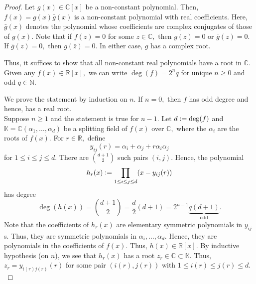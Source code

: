 \begin{proof}
    Let $g(x) \in \mathbb{C}[x]$ be a non-constant polynomial. Then, $f(x) = g(x)\bar{g}(x)$ is a non-constant polynomial with real coefficients. Here, $\bar{g}(x)$ denotes the polynomial whose coefficients are complex conjugates of those of $g(x).$ Note that if $f(z) = 0$ for some $z \in \mathbb{C},$ then $g(z) = 0$ or $\bar{g}(z) = 0.$ If $\bar{g}(z) = 0,$ then $g(\bar{z}) = 0.$ In either case, $g$ has a complex root.

    Thus, it suffices to show that all non-constant real polynomials have a root in $\mathbb{C}.$ Given any $f(x) \in \mathbb{R}[x],$ we can write $\deg(f) = 2^nq$ for unique $n \ge 0$ and odd $q \in \mathbb{N}.$

    We prove the statement by induction on $n.$ If $n = 0,$ then $f$ has odd degree and hence, has a real root. \\
    Suppose $n \ge 1$ and the statement is true for $n - 1.$ Let $d \vcentcolon= \deg(f)$ and $\mathbb{K} = \mathbb{C}(\alpha_1, \ldots, \alpha_d)$ be a splitting field of $f(x)$ over $\mathbb{C},$ where the $\alpha_i$ are the roots of $f(x).$ For $r \in \mathbb{R},$ define
    \begin{equation*} 
        y_{ij}(r) = \alpha_i + \alpha_j + r\alpha_i\alpha_j
    \end{equation*}
    for $1 \le i \le j \le d.$ There are $\binom{d + 1}{2}$ such pairs $(i, j).$ Hence, the polynomial
    \begin{equation*} 
        h_r(x) \vcentcolon= \prod_{1 \le i \le j \le d} (x - y_{ij}(r))
    \end{equation*}
    has degree
    \begin{equation*} 
        \deg(h(x)) = \binom{d + 1}{2} = \frac{d}{2}(d + 1) = 2^{n - 1}\underbrace{q(d + 1)}_{\text{odd}}.
    \end{equation*}
    Note that the coefficients of $h_r(x)$ are elementary symmetric polynomials in $y_{ij}$s. Thus, they are symmetric polynomials in $\alpha_i, \ldots, \alpha_d.$ Hence, they are polynomials in the coefficients of $f(x).$ Thus, $h(x) \in \mathbb{R}[x].$ By inductive hypothesis (on $n$), we see that $h_r(x)$ has a root $z_r \in \mathbb{C} \subset \mathbb{K}.$ Thus, $z_r = y_{i(r)j(r)}(r)$ for some pair $(i(r), j(r))$ with $1 \le i(r) \le j(r) \le d.$


\end{proof}

